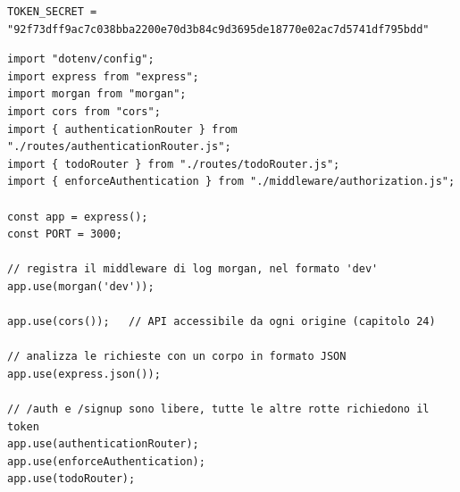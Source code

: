 \begin{lstlisting}[style=plain, name=.env]
TOKEN_SECRET = "92f73dff9ac7c038bba2200e70d3b84c9d3695de18770e02ac7d5741df795bdd"
\end{lstlisting}

\begin{affianco}[0.6][c]
\codicepiccolo
\begin{lstlisting}[style=js, name=index.js]
import "dotenv/config";
import express from "express";
import morgan from "morgan";
import cors from "cors";
import { authenticationRouter } from "./routes/authenticationRouter.js";
import { todoRouter } from "./routes/todoRouter.js";
import { enforceAuthentication } from "./middleware/authorization.js";

const app = express();
const PORT = 3000;

// registra il middleware di log morgan, nel formato 'dev'
app.use(morgan('dev'));

app.use(cors());   // API accessibile da ogni origine (capitolo 24)

// analizza le richieste con un corpo in formato JSON
app.use(express.json());

// /auth e /signup sono libere, tutte le altre rotte richiedono il token
app.use(authenticationRouter);
app.use(enforceAuthentication);
app.use(todoRouter);
\end{lstlisting}
\risultato
\begin{immagine}
\end{immagine}
\end{affianco}

